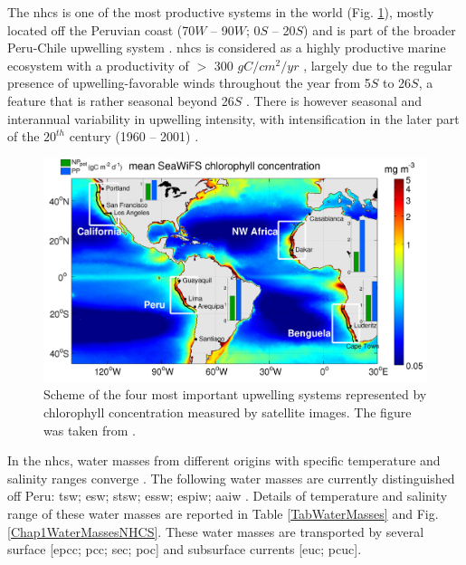 The \acrshort{nhcs} is one of the most productive systems in the world (Fig. \ref{Chap1UpwellingSystems}), mostly located off the Peruvian coast (70\textdegree $W$ – 90\textdegree $W$; 0\textdegree $S$ – 20\textdegree $S$) and is part of the broader Peru-Chile upwelling system \citep{GradChai2018,TaraArnt2001}. \acrshort{nhcs} is considered as a highly productive marine ecosystem with a productivity of $>$ 300 $gC/cm^{2}/yr$ \citep{KampCap5}, largely due to the regular presence of upwelling-favorable winds throughout the year from 5\textdegree $S$ to 26\textdegree $S$, a feature that is rather seasonal beyond 26\textdegree $S$ \citep{BelmEche2014}. There is however seasonal and interannual variability in upwelling intensity, with intensification in the later part of the $20^{th}$ century (1960 – 2001) \citep{NaraPaul2010}.\\

\begin{figure}[ht]
	\includegraphics[width=1.0\textwidth]{figures/Chap1UpwellingSystems.png}
	\centering
	\caption{Scheme of the four most important upwelling systems represented by chlorophyll concentration measured by satellite images. The figure was taken from \cite{MessChav2015}.}
	\label{Chap1UpwellingSystems}
\end{figure}

In the \acrshort{nhcs}, water masses from different origins with specific temperature and salinity ranges converge \citep{SilvRoja2009,MontCola2010,ChaiDomi2013}. The following water masses are currently distinguished off Peru: \acrfull{tsw}; \acrfull{esw}; \acrfull{stsw}; \acrfull{essw}; \acrfull{espiw}; \acrfull{aaiw} \citep{GradChai2018}. Details of temperature and salinity range of these water masses are reported in Table \ref{TabWaterMasses} and Fig. \ref{Chap1WaterMassesNHCS}. These water masses are transported by several surface [\acrfull{epcc}; \acrfull{pcc}; \acrfull{sec}; \acrfull{poc}] and subsurface currents [\acrfull{euc}; \acrfull{pcuc}].\\


